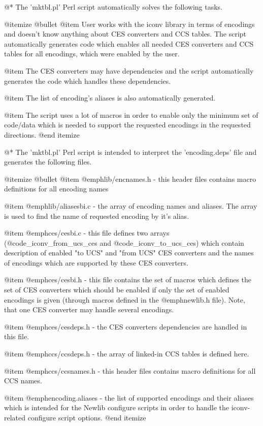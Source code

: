 @*
The 'mktbl.pl' Perl script automatically solves the following tasks.

@itemize @bullet
@item
User works with the iconv library in terms of encodings and doesn't know
anything about CES converters and CCS tables. The script automatically
generates code which enables all needed CES converters and CCS tables
for all encodings, which were enabled by the user.

@item
The CES converters may have dependencies and the script automatically
generates the code which handles these dependencies.

@item
The list of encoding's aliases is also automatically generated.

@item
The script uses a lot of macros in order to enable only the minimum set
of code/data which is needed to support the requested encodings in the
requested directions.
@end itemize

@*
The 'mktbl.pl' Perl script is intended to interpret the 'encoding.deps'
file and generates the following files.

@itemize @bullet
@item
@emph{lib/encnames.h} - this header files contains macro definitions for all
encoding names

@item
@emph{lib/aliasesbi.c} - the array of encoding names and aliases. The array
is used to find the name of requested encoding by it's alias.

@item
@emph{ces/cesbi.c} - this file defines two arrays
(@code{_iconv_from_ucs_ces} and @code{_iconv_to_ucs_ces}) which contain
description of enabled "to UCS" and "from UCS" CES converters and the
names of encodings which are supported by these CES converters.

@item
@emph{ces/cesbi.h} - this file contains the set of macros which defines
the set of CES converters which should be enabled if only the set of
enabled encodings is given (through macros defined in the
@emph{newlib.h} file). Note, that one CES converter may handle several
encodings.

@item
@emph{ces/cesdeps.h} - the CES converters dependencies are handled in
this file.

@item
@emph{ccs/ccsdeps.h} - the array of linked-in CCS tables is defined
here.

@item
@emph{ccs/ccsnames.h} - this header files contains macro definitions for all
CCS names.

@item
@emph{encoding.aliases} - the list of supported encodings and their
aliases which is intended for the Newlib configure scripts in order to
handle the iconv-related configure script options.
@end itemize





